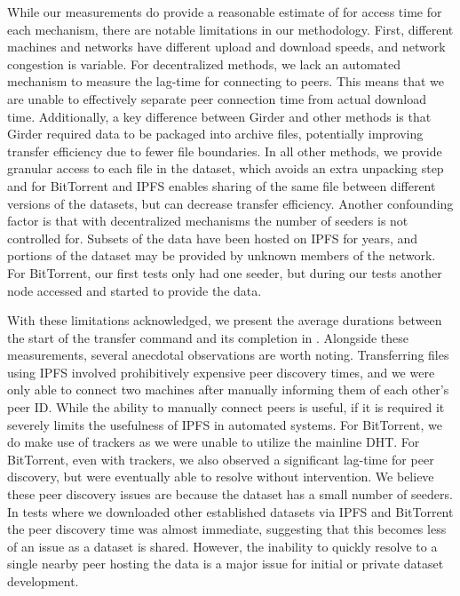 \documentclass[10pt,twocolumn,letterpaper]{article}
\begin{document}
While our measurements do provide a reasonable estimate of for access time for each mechanism, there are
  notable limitations in our methodology.
First, different machines and networks have different upload and download speeds, and network congestion is
  variable.
For decentralized methods, we lack an automated mechanism to measure the lag-time for connecting to peers.
This means that we are unable to effectively separate peer connection time from actual download time.
Additionally, a key difference between Girder and other methods is that Girder required data to be packaged
  into archive files, potentially improving transfer efficiency due to fewer file boundaries.
In all other methods, we provide granular access to each file in the dataset, which avoids an extra
  unpacking step and for BitTorrent and IPFS enables sharing of the same file between different versions of
  the datasets, but can decrease transfer efficiency.
Another confounding factor is that with decentralized mechanisms the number of seeders is not controlled
  for.
Subsets of the data have been hosted on IPFS for years, and portions of the dataset may be provided by
  unknown members of the network.
For BitTorrent, our first tests only had one seeder, but during our tests another node accessed and started
  to provide the data.

With these limitations acknowledged, we present the average durations between the start of the transfer
  command and its completion in .
Alongside these measurements, several anecdotal observations are worth noting.
Transferring files using IPFS involved prohibitively expensive peer discovery times, and we were only able
  to connect two machines after manually informing them of each other's peer ID.
While the ability to manually connect peers is useful, if it is required it severely limits the usefulness
  of IPFS in automated systems.
For BitTorrent, we do make use of trackers as we were unable to utilize the mainline DHT.
For BitTorrent, even with trackers, we also observed a significant lag-time for peer discovery, but were
  eventually able to resolve without intervention.
We believe these peer discovery issues are because the dataset has a small number of seeders.
In tests where we downloaded other established datasets via IPFS and BitTorrent the peer discovery time was
  almost immediate, suggesting that this becomes less of an issue as a dataset is shared.
However, the inability to quickly resolve to a single nearby peer hosting the data is a major issue for
  initial or private dataset development.
\end{document}
